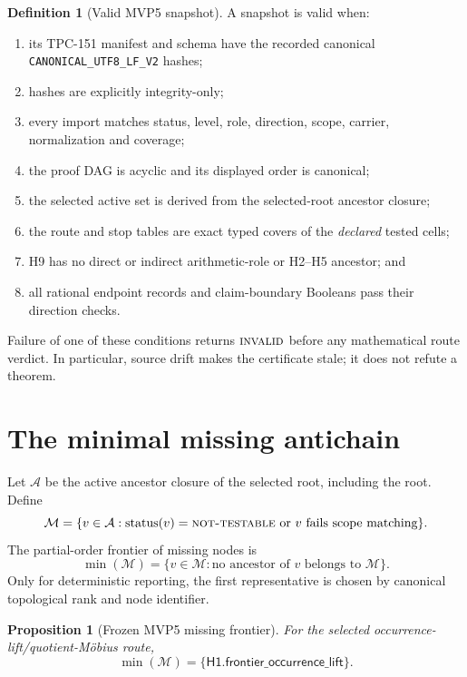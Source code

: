\documentclass[11pt]{article}
\newtheorem{proposition}[theorem]{Proposition}
\theoremstyle{definition}
\newtheorem{definition}[theorem]{Definition}
\theoremstyle{remark}
\newcommand{\NT}{\textnormal{\textsc{not-testable}}}
\newcommand{\INVALID}{\textnormal{\textsc{invalid}}}
\begin{document}
\begin{definition}[Valid MVP5 snapshot]
A snapshot is valid when:
\begin{enumerate}[label=(\alph*),leftmargin=2em]
\item its TPC-151 manifest and schema have the recorded canonical
  \texttt{CANONICAL\_UTF8\_LF\_V2} hashes;
\item hashes are explicitly integrity-only;
\item every import matches status, level, role, direction, scope,
  carrier, normalization and coverage;
\item the proof DAG is acyclic and its displayed order is canonical;
\item the selected active set is derived from the selected-root
  ancestor closure;
\item the route and stop tables are exact typed covers of the
  \emph{declared} tested cells;
\item H9 has no direct or indirect arithmetic-role or H2--H5 ancestor;
  and
\item all rational endpoint records and claim-boundary Booleans pass
  their direction checks.
\end{enumerate}
\end{definition}

Failure of one of these conditions returns \(\INVALID\) before any
mathematical route verdict.  In particular, source drift makes the
certificate stale; it does not refute a theorem.

\section{The minimal missing antichain}

Let \(\mathcal A\) be the active ancestor closure of the selected
root, including the root.  Define
\[
 \mathcal M=
 \{v\in\mathcal A:
   \operatorname{status}(v)=\NT
   \text{ or }v\text{ fails scope matching}\}.
\]
The partial-order frontier of missing nodes is
\[
 \min(\mathcal M)=
 \{v\in\mathcal M:
   \text{no ancestor of }v\text{ belongs to }\mathcal M\}.
\]
Only for deterministic reporting, the first representative is chosen
by canonical topological rank and node identifier.

\begin{proposition}[Frozen MVP5 missing frontier]
\label{prop:missing}
For the selected occurrence-lift/quotient-M\"obius route,
\[
 \boxed{
 \min(\mathcal M)=
 \{\mathsf{H1.frontier\_occurrence\_lift}\}.}
\]
\end{proposition}
\end{document}
